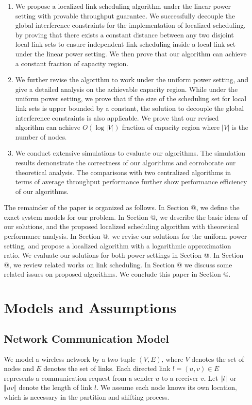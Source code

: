 \documentclass[journal]{IEEEtran}
\makeatletter
\newcommand{\Rmnum}[1]{\expandafter\@slowromancap\romannumeral #1@}
\makeatother
\begin{document}
\begin{enumerate}
    \item We propose a localized link scheduling algorithm under the linear power setting with provable throughput guarantee. We successfully decouple the global interference constraints for the implementation of localized scheduling, by proving that there exists a constant distance between any two disjoint local link sets to ensure independent link scheduling inside a local link set under the linear power setting. We then prove that our algorithm can achieve a constant fraction of capacity region.
  \item We further revise the algorithm to work under the uniform power setting, and give a detailed analysis on the achievable capacity region.  While under the uniform power setting, we prove that if the size of the scheduling set for local link sets is upper bounded by a constant, the solution to decouple the global interference constraints is also applicable. We prove that our revised algorithm can achieve $O(\log |V|)$ fraction of capacity region where $|V|$ is the number of nodes.
  \item We conduct extensive simulations to evaluate our algorithms. The simulation results demonstrate the correctness of our algorithms and corroborate our theoretical analysis.  The comparisons with two centralized algorithms in terms of average throughput performance further show performance efficiency of our algorithms.
\end{enumerate}

The remainder of the paper is organized as follows. In Section \Rmnum{2}, we define the exact system models for our problem. In Section \Rmnum{3}, we describe the basic ideas of our solutions, and the proposed localized scheduling algorithm with theoretical performance analysis. In Section \Rmnum{4}, we revise our solutions for the uniform power setting, and propose a localized algorithm with a logarithmic approximation ratio. We evaluate our solutions for both power settings in Section \Rmnum{5}. In Section \Rmnum{6}, we review related works on link scheduling.
In Section \Rmnum{7} we discuss some related issues on proposed algorithms.
We conclude this paper in Section \Rmnum{8}.

\section{Models and Assumptions}

\subsection{Network Communication Model}
We model a wireless network by a two-tuple $(V,E)$, where $V$  denotes the set of nodes and $E$  denotes the set of links. Each directed link $l=(u,v)\in E$  represents a communication request from a sender  $u$ to a receiver $v$. Let $\Vert l\Vert$  or $\Vert uv\Vert$  denote the length of link $l$. We assume each node knows  its own location, which is necessary in the partition and shifting process.
\end{document}
